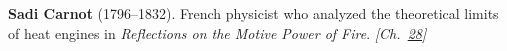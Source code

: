 \textbf{Sadi Carnot} (1796–1832). French physicist who analyzed the theoretical limits of heat engines in \emph{Reflections on the Motive Power of Fire}. \emph{[Ch.~\hyperref[ch:negativetemperature]{28}]}

